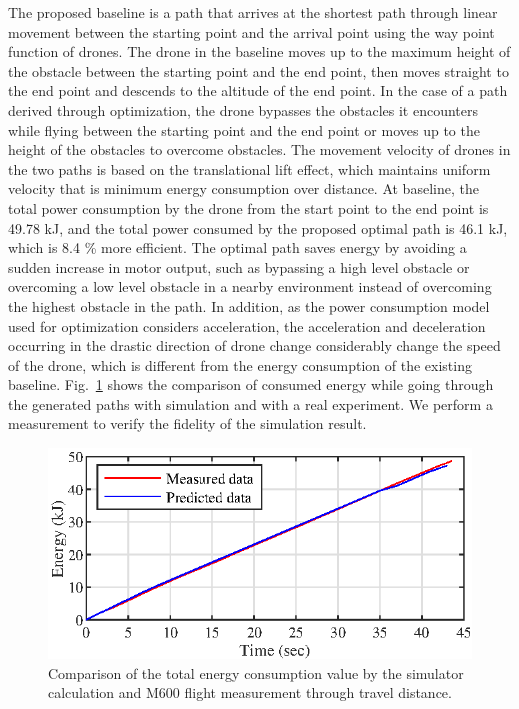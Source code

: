 \documentclass[journal]{./template/IEEEtran}
\begin{document}
The proposed baseline is a path that arrives at the shortest path through linear movement between the starting point and the arrival point using the way point function of drones. The drone in the baseline moves up to the maximum height of the obstacle between the starting point and the end point, then moves straight to the end point and descends to the altitude of the end point. 
In the case of a path derived through optimization, the drone bypasses the obstacles it encounters while flying between the starting point and the end point or moves up to the height of the obstacles to overcome obstacles. 
The movement velocity of drones in the two paths is based on the translational lift effect, which maintains uniform velocity that is minimum energy consumption over distance. 
At baseline, the total power consumption by the drone from the start point to the end point is 49.78 kJ, and the total power consumed by the proposed optimal path is 46.1 kJ, which is 8.4 \% more efficient. The optimal path saves energy by avoiding a sudden increase in motor output, such as bypassing a high level obstacle or overcoming a low level obstacle in a nearby environment instead of overcoming the highest obstacle in the path.
In addition, as the power consumption model used for optimization considers acceleration, the acceleration and deceleration occurring in the drastic direction of drone change considerably change the speed of the drone, which is different from the energy consumption of the existing baseline.
Fig.~\ref{fig:consumed_energy} shows the comparison of consumed energy while going through the generated paths with simulation and with a real experiment. We perform a measurement to verify the fidelity of the simulation result.

\begin{figure}[ht]
\centering\includegraphics[scale=1.0]{fig14/S_E.eps}
\caption{Comparison of the total energy consumption value by the simulator calculation and M600 flight measurement through travel distance.}
\label{fig:consumed_energy}
\end{figure}
\end{document}

